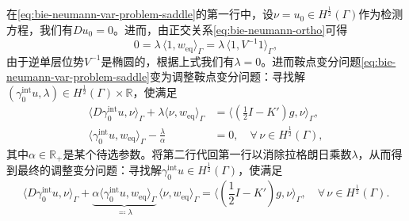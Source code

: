在\eqref{eq:bie-neumann-var-problem-saddle}的第一行中，设$\nu = u_{0} \in H^{\frac{1}{2}}(\Gamma)$作为检测方程，我们有$D u_{0} =0$。进而，由正交关系\eqref{eq:bie-neumann-ortho}可得
\begin{equation}
  \label{eq:bie-neumann-var-test-function}
  0 = \lambda \, \langle 1, w_{\text{eq}} \rangle_{\Gamma}
  = \lambda \, \langle 1, V^{-1} 1 \rangle_{\Gamma},
\end{equation}
由于逆单层位势$V^{-1}$是椭圆的，根据上式我们有$\lambda = 0$。进而鞍点变分问题\eqref{eq:bie-neumann-var-problem-saddle}变为调整鞍点变分问题：寻找解
$\left( \gamma_{0}^{\text{int}} u, \lambda \right) \in H^{\frac{1}{2}}(\Gamma) \times \mathbb{R}$，使满足
\begin{equation}
  \label{eq:bie-neumann-var-problem-saddle-modified}
  \begin{split}
    \langle D \gamma_{0}^{\text{int}} u, \nu \rangle_{\Gamma}
    + \lambda \langle \nu, w_{\text{eq}} \rangle_{\Gamma}
    & = \langle \left( \frac{1}{2} I - K' \right) g, \nu \rangle_{\Gamma}, \\
     \langle \gamma_{0}^{\text{int}} u, w_{\text{eq}} \rangle_{\Gamma} - \frac{\lambda}{\alpha} &= 0, \quad \forall \, \nu \in H^{\frac{1}{2}}(\Gamma),
  \end{split}
\end{equation}
其中$\alpha \in \mathbb{R}_{+}$是某个待选参数。将第二行代回第一行以消除拉格朗日乘数$\lambda$，从而得到最终的调整变分问题：寻找解$\gamma_{0}^{\text{int}} u \in H^{\frac{1}{2}}(\Gamma)$，使满足
\begin{equation}
  \label{eq:bie-neumann-var-problem-saddle-modified-final}
  \langle
  D \gamma_{0}^{\text{int}} u, \nu
  \rangle_{\Gamma}
  + \underbrace{
  \alpha
  \langle
  \gamma_{0}^{\text{int}} u, w_{\text{eq}}
  \rangle_{\Gamma}
  }_{\eqqcolon \lambda}
  \,
  \langle
  \nu, w_{\text{eq}}
  \rangle_{\Gamma}
  =
  \langle \left( \frac{1}{2} I - K' \right) g, \nu \rangle_{\Gamma},
  \quad \forall \, \nu \in H^{\frac{1}{2}}(\Gamma).
\end{equation}

